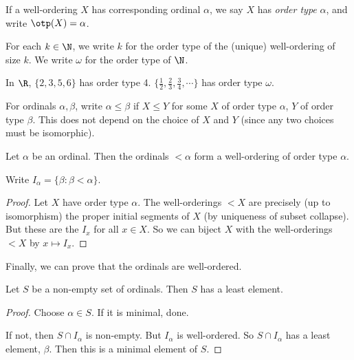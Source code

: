 \documentclass[a4paper]{article}
\begin{document}
\begin{defi}
  If a well-ordering $X$ has corresponding ordinal $\alpha$, we say $X$ has \emph{order type} $\alpha$, and write $\otp(X) = \alpha$.
\end{defi}

\begin{notation}
  For each $k\in \N$, we write $k$ for the order type of the (unique) well-ordering of size $k$. We write $\omega$ for the order type of $\N$.
\end{notation}

\begin{eg}
  In $\R$, $\{2, 3, 5 ,6\}$ has order type 4. $\{\frac{1}{2}, \frac{2}{3}, \frac{3}{4}, \cdots\}$ has order type $\omega$.
\end{eg}

\begin{notation}
  For ordinals $\alpha, \beta$, write $\alpha \leq \beta$ if $X\leq Y$ for some $X$ of order type $\alpha$, $Y$ of order type $\beta$. This does not depend on the choice of $X$ and $Y$ (since any two choices must be isomorphic).
\end{notation}

\begin{prop}
  Let $\alpha$ be an ordinal. Then the ordinals $<\alpha$ form a well-ordering of order type $\alpha$.
\end{prop}

\begin{notation}
  Write $I_\alpha = \{\beta: \beta < \alpha\}$.
\end{notation}

\begin{proof}
  Let $X$ have order type $\alpha$. The well-orderings $< X$ are precisely (up to isomorphism) the proper initial segments of $X$ (by uniqueness of subset collapse). But these are the $I_x$ for all $x\in X$. So we can biject $X$ with the well-orderings $< X$ by $x\mapsto I_x$.
\end{proof}

Finally, we can prove that the ordinals are well-ordered.
\begin{prop}
  Let $S$ be a non-empty set of ordinals. Then $S$ has a least element.
\end{prop}

\begin{proof}
  Choose $\alpha\in S$. If it is minimal, done.

  If not, then $S\cap I_\alpha$ is non-empty. But $I_\alpha$ is well-ordered. So $S\cap I_\alpha$ has a least element, $\beta$. Then this is a minimal element of $S$.
\end{proof}
\end{document}
